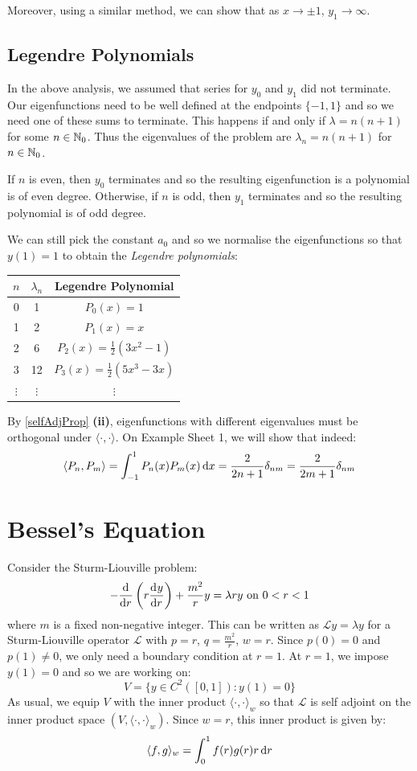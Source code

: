 \documentclass[../main.tex]{subfiles}
\begin{document}
Moreover, using a similar method, we can show that as $x \to \pm 1$, $y_1 \to \infty$.
\subsection{Legendre Polynomials}
In the above analysis, we assumed that series for $y_0$ and $y_1$ did not terminate.
Our eigenfunctions need to be well defined at the endpoints $\{-1, 1\}$ and so we need one of these sums to terminate.
This happens if and only if $\lambda = n(n + 1)$ for some $n \in \mathbb{N}_0$.
Thus the eigenvalues of the problem are $\lambda_n = n(n + 1)$ for $n \in \mathbb{N}_0$.

If $n$ is even, then $y_0$ terminates and so the resulting eigenfunction is a polynomial is of even degree.
Otherwise, if $n$ is odd, then $y_1$ terminates and so the resulting polynomial is of odd degree.

We can still pick the constant $a_0$ and so we normalise the eigenfunctions so that $y(1) = 1$ to obtain the \textit{Legendre polynomials}:
\begin{center}
\begin{tabular}{c|c|c}
$n$ & $\lambda_n$ & Legendre Polynomial \\
\hline
0 & 1 & $P_0(x) = 1$ \\
1 & 2 & $P_1(x) = x$ \\
2 & 6 & $P_2(x) = \frac{1}{2}(3x^2 - 1)$ \\
3 & 12 & $P_3(x) = \frac{1}{2}(5x^3  - 3x)$ \\
$\vdots$ & $\vdots$ & $\vdots$
\end{tabular}
\end{center}
By \cref{selfAdjProp} \textbf{(ii)}, eigenfunctions with different eigenvalues must be orthogonal under $\langle \cdot, \cdot \rangle$.
On Example Sheet 1, we will show that indeed:
\[
  \langle P_n, P_m \rangle = \int_{-1}^{1} P_n(x)P_m(x) \d{x} = \frac{2}{2n + 1}\delta_{n m} = \frac{2}{2m + 1} \delta_{n m}
\]
\section{Bessel's Equation} \label{besselSec}
Consider the Sturm-Liouville problem:
\begin{equation}
  -\deriv{}{r}\left(r \deriv{y}{r}\right) + \frac{m^2}{r}y = \lambda ry \text{ on } 0 < r < 1 \label{besselSL}
\end{equation}
where $m$ is a fixed non-negative integer.
This can be written as $\mathcal{L} y = \lambda y$ for a Sturm-Liouville operator $\mathcal{L}$ with $p = r$, $q = \frac{m^2}{r}$, $w = r$.
Since $p(0) = 0$ and $p(1) \neq 0$, we only need a boundary condition at $r = 1$.
At $r = 1$, we impose $y(1) = 0$ and so we are working on:
\[
  V = \{y \in C^2([0, 1]): y(1) = 0\}
\]
As usual, we equip $V$ with the inner product $\langle \cdot, \cdot \rangle_{w}$ so that $\mathcal{L}$ is self adjoint on the inner product space $(V, \langle \cdot, \cdot \rangle_{w})$.
Since $w = r$, this inner product is given by:
\[
  \langle f, g \rangle_{w} = \int_{0}^{1} f(r)g(r)r \d{r}
\]
\end{document}
